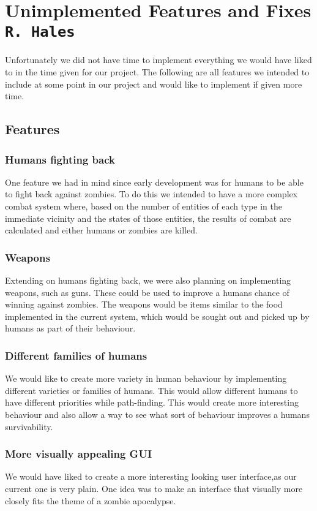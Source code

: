 \pagestyle{empty}
\section{Unimplemented Features and Fixes\\{\small\tt{R.~Hales}}}
Unfortunately we did not have time to implement everything we would have liked to in the time given for our project. The following are all features we intended to include at some point in our project and would like to implement if given more time.

\subsection{Features}

\subsubsection{Humans fighting back}
One feature we had in mind since early development was for humans to be able to fight back against zombies. To do this we  intended to have a more complex combat system where, based on the number of entities of each type in the immediate vicinity and the states of those entities, the results of combat are calculated and either humans or zombies are killed.

\subsubsection{Weapons}
Extending on humans fighting back, we were also planning on implementing weapons, such as guns. These could be used to improve a humans chance of winning against zombies. The weapons would be items similar to the food implemented in the current system, which would be sought out and picked up by humans as part of their behaviour.

\subsubsection{Different families of humans}
 We would like to create more variety in human behaviour by implementing different varieties or families of humans. This would allow different humans to have different priorities while path-finding. This would create more interesting behaviour and also allow a way to see what sort of behaviour improves a humans survivability.

\subsubsection{More visually appealing GUI}
We would have liked to create a more interesting looking user interface,as our current one is very plain.  One idea was to make an interface that visually more closely fits the theme of a zombie apocalypse. 


